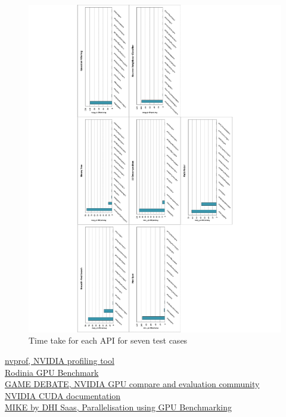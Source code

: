 \documentclass[paper=a4, fontsize=11pt]{scrartcl}
\numberwithin{equation}{section}		%
\numberwithin{figure}{section}			%
\numberwithin{table}{section}				%
\begin{document}
\begin{figure}[!h]
\centering
\includegraphics[scale=0.6]{../imgs/m6000.pdf}
\caption{Time take for each API for seven test cases}
\label{fig:6000}
\end{figure}


\newpage
\clearpage
\begin{thebibliography}{9}
{\href{http://docs.nvidia.com/cuda/profiler-users-guide/#nvprof-overview}{nvprof, NVIDIA profiling tool} } \\
{\href{http://www.cs.virginia.edu/~skadron/wiki/rodinia/index.php/Rodinia:Accelerating_Compute-Intensive_Applications_with_Accelerators} {Rodinia GPU Benchmark}}\\
{\href{http://www.game-debate.com/gpu/index.php?gid=1658&gid2=1150&compare=geforce-gt-630-gainward-2gb-edition-vs-geforce-gtx-650-2gb}{GAME DEBATE, NVIDIA GPU compare and evaluation community}} \\
{\href{http://docs.nvidia.com/cuda/cuda-getting-started-guide-for-linux/#axzz4AXrC80gu}{NVIDIA CUDA documentation} }\\
{\href {http://docs.nvidia.com/cuda/cuda-getting-started-guide-for-linux/#axzz4AXrC80gu}{MIKE by DHI Saas, Parallelisation using GPU Benchmarking} } \\

\end{thebibliography}
\end{document}
